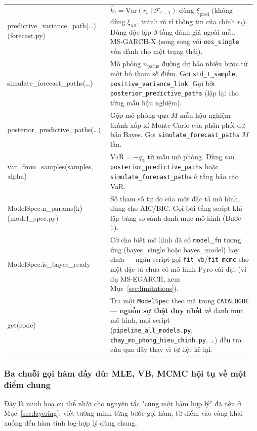 \documentclass[11pt,a4paper]{article}
\newcommand{\code}[1]{\texttt{#1}}
\begin{document}
\begin{longtable}{@{}>{\ttfamily\scriptsize\raggedright\arraybackslash}p{5.0cm} >{\raggedright\arraybackslash}p{9.5cm}@{}}
predictive\_variance\_path(\ldots) \newline \footnotesize{(forecast.py)} & $\hat h_t=\mathrm{Var}(r_t\mid\mathcal F_{t-1})$ dùng $\xi_{\text{pred}}$ (không dùng $\xi_{\text{filt}}$, tránh rò rỉ thông tin của chính $r_t$). Dùng độc lập ở tầng đánh giá ngoài mẫu MS-GARCH-X (song song với \code{oos\_single} vốn dành cho một trạng thái). \\
simulate\_forecast\_paths(\ldots) & Mô phỏng $n_{\text{paths}}$ đường dự báo nhiều bước từ một bộ tham số điểm. Gọi \code{std\_t\_sample}, \code{positive\_variance\_link}. Gọi bởi \code{posterior\_predictive\_paths} (lặp lại cho từng mẫu hậu nghiệm). \\
posterior\_predictive\_paths(\ldots) & Gộp mô phỏng qua $M$ mẫu hậu nghiệm thành xấp xỉ Monte Carlo của phân phối dự báo Bayes. Gọi \code{simulate\_forecast\_paths} $M$ lần. \\
var\_from\_samples(samples, alpha) & $\mathrm{VaR}=-q_\alpha$ từ mẫu mô phỏng. Dùng sau \code{posterior\_predictive\_paths} hoặc \code{simulate\_forecast\_paths} ở tầng báo cáo VaR. \\
ModelSpec.n\_params(k) \newline \footnotesize{(model\_spec.py)} & Số tham số tự do của một đặc tả mô hình, dùng cho AIC/BIC. Gọi bởi tầng script khi lập bảng so sánh danh mục mô hình (Bước 1). \\
ModelSpec.is\_bayes\_ready & Cờ cho biết mô hình đã có \code{model\_fn} tương ứng (bayes\_single hoặc bayes\_model) hay chưa --- ngăn script gọi \code{fit\_vb}/\code{fit\_mcmc} cho một đặc tả chưa có mô hình Pyro cài đặt (ví dụ MS-EGARCH, xem Mục~\ref{sec:limitations}). \\
get(code) & Tra một \code{ModelSpec} theo mã trong \code{CATALOGUE} --- \textbf{nguồn sự thật duy nhất} về danh mục mô hình, mọi script (\code{pipeline\_all\_models.py}, \code{chay\_mo\_phong\_hieu\_chinh.py}, \ldots) đều tra cứu qua đây thay vì tự liệt kê lại. \\
\end{longtable}

\subsubsection{Ba chuỗi gọi hàm đầy đủ: MLE, VB, MCMC hội tụ về một điểm chung}
\label{sec:three-chains}

Đây là minh hoạ cụ thể nhất cho nguyên tắc "cùng một hàm hợp lý" đã nêu ở
Mục~\ref{sec:layering}: viết tường minh từng bước gọi hàm, từ điểm vào công khai
xuống đến hàm tính log-hợp lý dùng chung.
\end{document}

